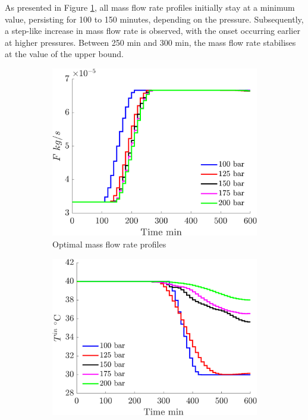 \documentclass[a4paper,fleqn]{cas-dc}
\begin{document}
		As presented in Figure \ref{fig:profiles_F}, all mass flow rate profiles initially stay at a minimum value, persisting for 100 to 150 minutes, depending on the pressure. Subsequently, a step-like increase in mass flow rate is observed, with the onset occurring earlier at higher pressures. Between 250 min and 300 min, the mass flow rate stabilises at the value of the upper bound.
		
		\begin{figure}[t!]
			\centering
			\begin{subfigure}[t]{\columnwidth}
				\centering
				\includegraphics[width=0.90\columnwidth]{Figures/Results/Profile_F.png}	
				\caption{Optimal mass flow rate profiles}
				\label{fig:profiles_F}
			\end{subfigure}%
			\par\bigskip %
			\begin{subfigure}[t]{\columnwidth}
				\centering
				\includegraphics[width=0.90\columnwidth]{Figures/Results/Profile_T.png}	

\end{subfigure}
\end{figure}
\end{document}
